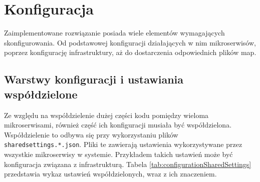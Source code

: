\section{Konfiguracja}
\label{sec:konfiguracja}

\par Zaimplementowane rozwiązanie posiada wiele elementów wymagających skonfigurowania. Od podstawowej konfiguracji działających w nim mikroserwisów, poprzez konfigurację infrastruktury, aż do dostarczenia odpowiednich plików map.

\subsection{Warstwy konfiguracji i ustawiania współdzielone}

\par Ze względu na współdzielenie dużej części kodu pomiędzy wieloma mikroserwisami, również część ich konfiguracji musiała być współdzielona. Współdzielenie to odbywa się przy wykorzystaniu plików \texttt{sharedsettings.*.json}. Pliki te zawierają ustawienia wykorzystywane przez wszystkie mikroserwisy w systemie. Przykładem takich ustawień może być konfiguracja związana z infrastrukturą. Tabela \ref{tab:configurationSharedSettings} przedstawia wykaz ustawień współdzielonych, wraz z ich znaczeniem.


